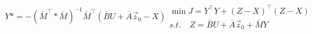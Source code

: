 \documentclass{article}
\begin{document}
\thispagestyle{empty}

$$
Y* = -(\bar{M}^\top * \bar{M})^{-1}\bar{M}^\top(\bar{B} U + \bar{A}\vec{z}_0 - X)
\begin{array}{l}
\min J = Y^\top Y + (Z-X)^\top(Z-X)\\
s.t.\quad Z=\bar{B}U + \bar{A}\vec{z}_0 + \bar{M}Y
\end{array}
$$
\end{document}
